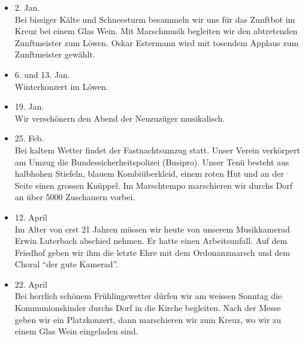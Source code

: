 \begin{multicols}{2}


    \begin{itemize}

        \item[]2. Jan.\\
        Bei bissiger Kälte und Schneesturm besammeln wir uns für das Zunftbot im
        Kreuz bei einem Glas Wein. Mit Marschmusik begleiten wir den abtretenden
        Zunftmeister zum Löwen. Oskar Estermann wird mit tosendem Applaus zum
        Zunftmeister gewählt.

        \item[]6. und 13. Jan.\\
        Winterkonzert im Löwen.

        \item[]19. Jan.\\
        Wir verschönern den Abend der Neuzuzüger musikalisch.

        \item[]25. Feb.\\
        Bei kaltem Wetter findet der Fastnachtsumzug statt. Unser Verein
        verkörpert am Umzug die Bundessicherheitspolizei (Busipro). Unser Tenü
        besteht aus halbhohen Stiefeln, blauem Kombiüberkleid, einem roten Hut
        und an der Seite einen grossen Knüppel. Im Marschtempo marschieren wir
        durchs Dorf an über 5000 Zuschauern vorbei.

        \item[]12. April\\
        Im Alter von erst 21 Jahren müssen wir heute von unserem Musikkamerad
        Erwin Luterbach abschied nehmen. Er hatte einen Arbeitsunfall. Auf dem
        Friedhof geben wir ihm die letzte Ehre mit dem Ordonanzmarsch und dem
        Choral \enquote{der gute Kamerad}.

        \item[]22. April\\
        Bei herrlich schönem Frühlingswetter dürfen wir am weissen Sonntag die
        Kommunionskinder durchs Dorf in die Kirche begleiten. Nach der Messe
        geben wir ein Platzkonzert, dann marschieren wir zum Kreuz, wo wir zu
        einem Glas Wein eingeladen sind.


\end{itemize}
\end{multicols}
